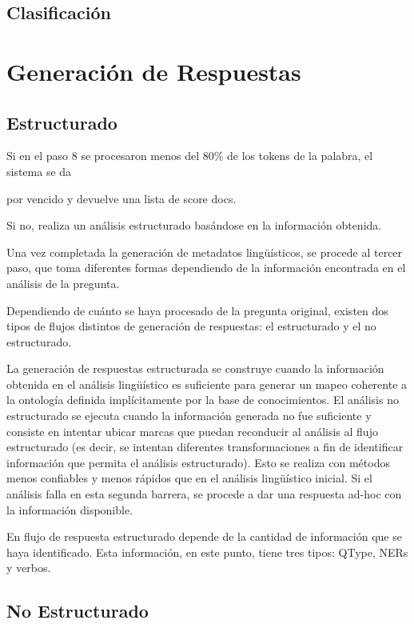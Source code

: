 \subsection{Clasificación}
\label{subsec:qtype}


\section{Generación de Respuestas}

\subsection{Estructurado}
Si en el paso 8 se procesaron menos del 80\% de los tokens de la
palabra, el sistema se da 

por vencido y devuelve una lista de score docs.

Si no, realiza un análisis estructurado basándose en la
información obtenida.


Una vez completada la generación de
metadatos lingüísticos, se procede al tercer paso, que toma
diferentes formas dependiendo de la información encontrada en el
análisis de la pregunta.


Dependiendo de cuánto se haya procesado de la pregunta original,
existen dos tipos de flujos distintos de generación de respuestas: el
estructurado y el no estructurado.

La generación de respuestas estructurada se construye cuando la
información obtenida en el análisis lingüístico es suficiente
para generar un mapeo coherente a la ontología definida
implícitamente por la base de conocimientos. El análisis no
estructurado se ejecuta cuando la información generada no fue
suficiente y consiste en intentar ubicar marcas que puedan reconducir
al análisis al flujo estructurado (es decir, se intentan diferentes
transformaciones a fin de identificar información que permita el
análisis estructurado). Esto se realiza con métodos menos
confiables y menos rápidos que en el análisis lingüístico
inicial. Si el análisis falla en esta segunda barrera, se procede a
dar una respuesta ad-hoc con la información disponible. 

En flujo de respuesta estructurado depende de la cantidad de
información que se haya identificado. Esta información, en este
punto, tiene tres tipos: QType, NERs y verbos. 

\subsection{No Estructurado}

